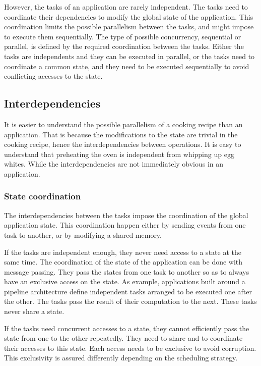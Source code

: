 However, the tasks of an application are rarely independent.
The tasks need to coordinate their dependencies to modify the global state of the application.
This coordination limits the possible parallelism between the tasks, and might impose to execute them sequentially.
The type of possible concurrency, sequential or parallel, is defined by the required coordination between the tasks.
Either the tasks are independents and they can be executed in parallel, or the tasks need to coordinate a common state, and they need to be executed sequentially to avoid conflicting accesses to the state.


\subsection{Interdependencies}

It is easier to understand the possible parallelism of a cooking recipe than an application.
That is because the modifications to the state are trivial in the cooking recipe, hence the interdependencies between operations.
It is easy to understand that preheating the oven is independent from whipping up egg whites.
While the interdependencies are not immediately obvious in an application.

\subsubsection{State coordination}

The interdependencies between the tasks impose the coordination of the global application state.
This coordination happen either by sending events from one task to another, or by modifying a shared memory.

If the tasks are independent enough, they never need access to a state at the same time.
The coordination of the state of the application can be done with message passing.
They pass the states from one task to another so as to always have an exclusive access on the state.
As example, applications built around a pipeline architecture define independent tasks arranged to be executed one after the other.
The tasks pass the result of their computation to the next.
These tasks never share a state.

If the tasks need concurrent accesses to a state, they cannot efficiently pass the state from one to the other repeatedly.
They need to share and to coordinate their accesses to this state.
Each access needs to be exclusive to avoid corruption.
This exclusivity is assured differently depending on the scheduling strategy.

